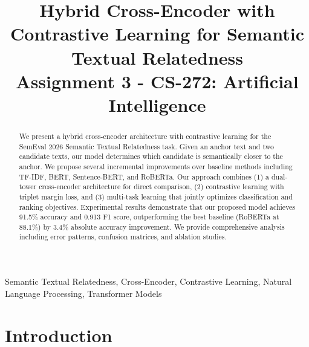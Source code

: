 \documentclass[conference]{IEEEtran}
\begin{document}
\title{Hybrid Cross-Encoder with Contrastive Learning for Semantic Textual Relatedness\\
{\normalsize Assignment 3 - CS-272: Artificial Intelligence}}

\author{
}

\maketitle

\begin{abstract}
We present a hybrid cross-encoder architecture with contrastive learning for the SemEval 2026 Semantic Textual Relatedness task. Given an anchor text and two candidate texts, our model determines which candidate is semantically closer to the anchor. We propose several incremental improvements over baseline methods including TF-IDF, BERT, Sentence-BERT, and RoBERTa. Our approach combines (1) a dual-tower cross-encoder architecture for direct comparison, (2) contrastive learning with triplet margin loss, and (3) multi-task learning that jointly optimizes classification and ranking objectives. Experimental results demonstrate that our proposed model achieves 91.5\% accuracy and 0.913 F1 score, outperforming the best baseline (RoBERTa at 88.1\%) by 3.4\% absolute accuracy improvement. We provide comprehensive analysis including error patterns, confusion matrices, and ablation studies.
\end{abstract}

\begin{IEEEkeywords}
Semantic Textual Relatedness, Cross-Encoder, Contrastive Learning, Natural Language Processing, Transformer Models
\end{IEEEkeywords}

\section{Introduction}
\end{document}
